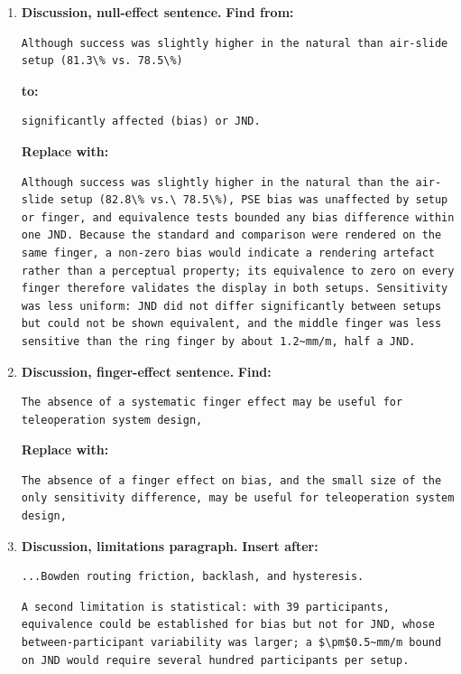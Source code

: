 \documentclass[11pt,a4paper]{article}
\newcommand{\replace}{\noindent\textbf{Replace with:}\par\nopagebreak}
\begin{document}
\begin{enumerate}[resume]
\item \textbf{Discussion, null-effect sentence.}
\noindent\textbf{Find from:}\begin{lstlisting}
Although success was slightly higher in the natural than air-slide setup (81.3\% vs. 78.5\%)
\end{lstlisting}
\noindent\textbf{to:}\begin{lstlisting}
significantly affected (bias) or JND.
\end{lstlisting}
\replace
\begin{lstlisting}
Although success was slightly higher in the natural than the air-slide setup (82.8\% vs.\ 78.5\%), PSE bias was unaffected by setup or finger, and equivalence tests bounded any bias difference within one JND. Because the standard and comparison were rendered on the same finger, a non-zero bias would indicate a rendering artefact rather than a perceptual property; its equivalence to zero on every finger therefore validates the display in both setups. Sensitivity was less uniform: JND did not differ significantly between setups but could not be shown equivalent, and the middle finger was less sensitive than the ring finger by about 1.2~mm/m, half a JND.
\end{lstlisting}

\item \textbf{Discussion, finger-effect sentence.}
\noindent\textbf{Find:}\begin{lstlisting}
The absence of a systematic finger effect may be useful for teleoperation system design,
\end{lstlisting}
\replace
\begin{lstlisting}
The absence of a finger effect on bias, and the small size of the only sensitivity difference, may be useful for teleoperation system design,
\end{lstlisting}

\item \textbf{Discussion, limitations paragraph.}
\noindent\textbf{Insert after:}\begin{lstlisting}
...Bowden routing friction, backlash, and hysteresis.
\end{lstlisting}
\begin{lstlisting}
A second limitation is statistical: with 39 participants, equivalence could be established for bias but not for JND, whose between-participant variability was larger; a $\pm$0.5~mm/m bound on JND would require several hundred participants per setup.
\end{lstlisting}


\end{enumerate}
\end{document}
